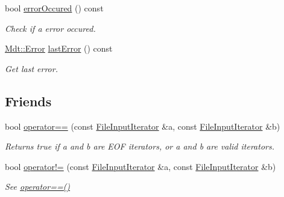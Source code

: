 \begin{DoxyCompactItemize}
bool \hyperlink{struct_mdt_1_1_plain_text_1_1_file_input_iterator_afa93baaf36f16456fa29451fa4fcf9f3}{error\+Occured} () const 
\begin{DoxyCompactList}\small\item\em Check if a error occured. \end{DoxyCompactList}\item 
\hyperlink{class_mdt_1_1_error}{Mdt\+::\+Error} \hyperlink{struct_mdt_1_1_plain_text_1_1_file_input_iterator_a0d9ed2faf04b16e3a03fabd6a09db67e}{last\+Error} () const 
\begin{DoxyCompactList}\small\item\em Get last error. \end{DoxyCompactList}\end{DoxyCompactItemize}
\subsection*{Friends}
\begin{DoxyCompactItemize}
\item 
bool \hyperlink{struct_mdt_1_1_plain_text_1_1_file_input_iterator_a0728389e31ef4f52e51a7725f31cdf52}{operator==} (const \hyperlink{struct_mdt_1_1_plain_text_1_1_file_input_iterator}{File\+Input\+Iterator} \&a, const \hyperlink{struct_mdt_1_1_plain_text_1_1_file_input_iterator}{File\+Input\+Iterator} \&b)\hypertarget{struct_mdt_1_1_plain_text_1_1_file_input_iterator_a0728389e31ef4f52e51a7725f31cdf52}{}\label{struct_mdt_1_1_plain_text_1_1_file_input_iterator_a0728389e31ef4f52e51a7725f31cdf52}

\begin{DoxyCompactList}\small\item\em Returns true if a and b are E\+OF iterators, or a and b are valid iterators. \end{DoxyCompactList}\item 
bool \hyperlink{struct_mdt_1_1_plain_text_1_1_file_input_iterator_a72b46be4d1041d39fd539fda1124eb45}{operator!=} (const \hyperlink{struct_mdt_1_1_plain_text_1_1_file_input_iterator}{File\+Input\+Iterator} \&a, const \hyperlink{struct_mdt_1_1_plain_text_1_1_file_input_iterator}{File\+Input\+Iterator} \&b)\hypertarget{struct_mdt_1_1_plain_text_1_1_file_input_iterator_a72b46be4d1041d39fd539fda1124eb45}{}\label{struct_mdt_1_1_plain_text_1_1_file_input_iterator_a72b46be4d1041d39fd539fda1124eb45}

\begin{DoxyCompactList}\small\item\em See \hyperlink{struct_mdt_1_1_plain_text_1_1_file_input_iterator_a0728389e31ef4f52e51a7725f31cdf52}{operator==()} \end{DoxyCompactList}\end{DoxyCompactItemize}


